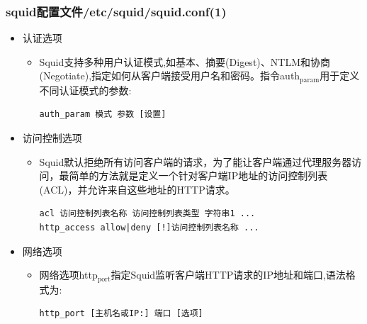 \documentclass[xcolor=svgnames,presentation]{beamer}
\begin{document}
\begin{frame}[fragile]
\frametitle{squid配置文件/etc/squid/squid.conf(1)}
\label{sec-4-2}
\begin{itemize}

\item 认证选项
\label{sec-4-2-1}%
\begin{itemize}

\item Squid支持多种用户认证模式,如基本、摘要(Digest)、NTLM和协商(Negotiate),指定如何从客户端接受用户名和密码。指令auth$_{\mathrm{param}}$用于定义不同认证模式的参数:\\
\label{sec-4-2-1-1}%
\begin{verbatim}
auth_param 模式 参数 [设置]
\end{verbatim}
\end{itemize} %

\item 访问控制选项
\label{sec-4-2-2}%
\begin{itemize}

\item Squid默认拒绝所有访问客户端的请求，为了能让客户端通过代理服务器访问，最简单的方法就是定义一个针对客户端IP地址的访问控制列表(ACL)，并允许来自这些地址的HTTP请求。\\
\label{sec-4-2-2-1}%
\begin{verbatim}
acl 访问控制列表名称 访问控制列表类型 字符串1 ...
http_access allow|deny [!]访问控制列表名称 ...
\end{verbatim}
\end{itemize} %

\item 网络选项
\label{sec-4-2-3}%
\begin{itemize}

\item 网络选项http$_{\mathrm{port}}$指定Squid监听客户端HTTP请求的IP地址和端口,语法格式为:\\
\label{sec-4-2-3-1}%
\begin{verbatim}
http_port [主机名或IP:] 端口 [选项]
\end{verbatim}
\end{itemize} %
\end{itemize} %
\end{frame}
\end{document}
